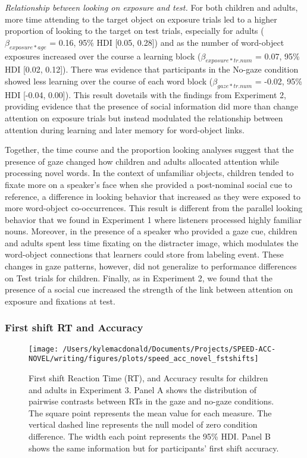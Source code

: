 \documentclass[man,floatsintext]{apa6}
\begin{document}
\emph{Relationship between looking on exposure and test.} For both
children and adults, more time attending to the target object on
exposure trials led to a higher proportion of looking to the target on
test trials, especially for adults (\(\beta_{exposure*age}\) = 0.16,
95\% HDI {[}0.05, 0.28{]}) and as the number of word-object exposures
increased over the course a learning block (\(\beta_{exposure*tr.num}\)
= 0.07, 95\% HDI {[}0.02, 0.12{]}). There was evidence that participants
in the No-gaze condition showed less learning over the course of each
word block (\(\beta_{gaze*tr.num}\) = -0.02, 95\% HDI {[}-0.04,
0.00{]}). This result dovetails with the findings from Experiment 2,
providing evidence that the presence of social information did more than
change attention on exposure trials but instead modulated the
relationship between attention during learning and later memory for
word-object links.

Together, the time course and the proportion looking analyses suggest
that the presence of gaze changed how children and adults allocated
attention while processing novel words. In the context of unfamiliar
objects, children tended to fixate more on a speaker's face when she
provided a post-nominal social cue to reference, a difference in looking
behavior that increased as they were exposed to more word-object
co-occurrences. This result is different from the parallel looking
behavior that we found in Experiment 1 where listeners processed highly
familiar nouns. Moreover, in the presence of a speaker who provided a
gaze cue, children and adults spent less time fixating on the distracter
image, which modulates the word-object connections that learners could
store from labeling event. These changes in gaze patterns, however, did
not generalize to performance differences on Test trials for children.
Finally, as in Experiment 2, we found that the presence of a social cue
increased the strength of the link between attention on exposure and
fixations at test.

\subsubsection{First shift RT and
Accuracy}\label{first-shift-rt-and-accuracy}

\begin{figure}[!t]

{\centering \texttt{[image: /Users/kylemacdonald/Documents/Projects/SPEED-ACC-NOVEL/writing/figures/plots/speed\_acc\_novel\_fstshifts]} 

}

\caption{First shift Reaction Time (RT), and Accuracy results for children and adults in Experiment 3. Panel A shows the distribution of pairwise contrasts between RTs in the gaze and no-gaze conditions. The square point represents the mean value for each measure. The vertical dashed line represents the null model of zero condition difference. The width each point represents the 95\% HDI. Panel B shows the same information but for participants' first shift accuracy.}\label{fig:speed-acc-novel-shifts}
\end{figure}
\end{document}
